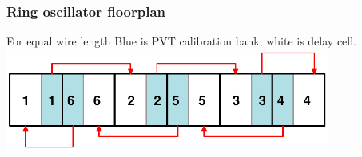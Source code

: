 \documentclass[t, screen, aspectratio=43]{beamer}
\begin{document}
\begin{frame}
	\frametitle{Ring oscillator floorplan}
	\begin{block}{For equal wire length}
	Blue is PVT calibration bank, white is delay cell. 
	\center\includegraphics[width=0.8\textwidth, angle=0]{ro_floorplan}

  
	\end{block}

\end{frame}












\end{document}
